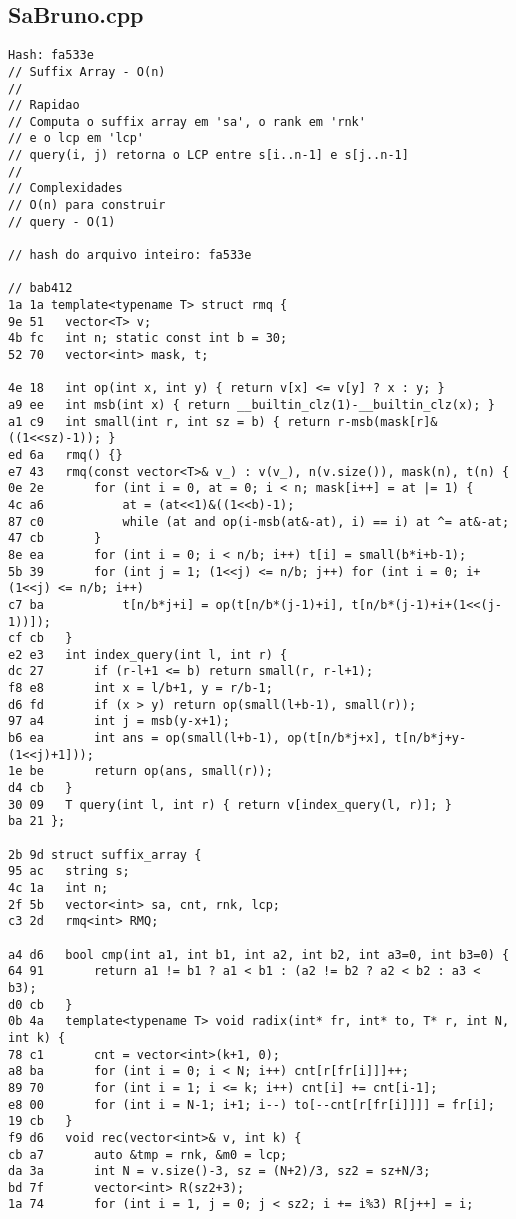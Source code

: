 \documentclass[11pt, a4paper, twoside]{article}
\begin{document}
\subsection{SaBruno.cpp}
\begin{lstlisting}
Hash: fa533e
// Suffix Array - O(n)
//
// Rapidao
// Computa o suffix array em 'sa', o rank em 'rnk'
// e o lcp em 'lcp'
// query(i, j) retorna o LCP entre s[i..n-1] e s[j..n-1]
//
// Complexidades
// O(n) para construir
// query - O(1)

// hash do arquivo inteiro: fa533e

// bab412
1a 1a template<typename T> struct rmq {
9e 51 	vector<T> v;
4b fc 	int n; static const int b = 30;
52 70 	vector<int> mask, t;
      
4e 18 	int op(int x, int y) { return v[x] <= v[y] ? x : y; }
a9 ee 	int msb(int x) { return __builtin_clz(1)-__builtin_clz(x); }
a1 c9 	int small(int r, int sz = b) { return r-msb(mask[r]&((1<<sz)-1)); }
ed 6a 	rmq() {}
e7 43 	rmq(const vector<T>& v_) : v(v_), n(v.size()), mask(n), t(n) {
0e 2e 		for (int i = 0, at = 0; i < n; mask[i++] = at |= 1) {
4c a6 			at = (at<<1)&((1<<b)-1);
87 c0 			while (at and op(i-msb(at&-at), i) == i) at ^= at&-at;
47 cb 		}
8e ea 		for (int i = 0; i < n/b; i++) t[i] = small(b*i+b-1);
5b 39 		for (int j = 1; (1<<j) <= n/b; j++) for (int i = 0; i+(1<<j) <= n/b; i++)
c7 ba 			t[n/b*j+i] = op(t[n/b*(j-1)+i], t[n/b*(j-1)+i+(1<<(j-1))]);
cf cb 	}
e2 e3 	int index_query(int l, int r) {
dc 27 		if (r-l+1 <= b) return small(r, r-l+1);
f8 e8 		int x = l/b+1, y = r/b-1;
d6 fd 		if (x > y) return op(small(l+b-1), small(r));
97 a4 		int j = msb(y-x+1);
b6 ea 		int ans = op(small(l+b-1), op(t[n/b*j+x], t[n/b*j+y-(1<<j)+1]));
1e be 		return op(ans, small(r));
d4 cb 	}
30 09 	T query(int l, int r) { return v[index_query(l, r)]; }
ba 21 };

2b 9d struct suffix_array {
95 ac 	string s;
4c 1a 	int n;
2f 5b 	vector<int> sa, cnt, rnk, lcp;
c3 2d 	rmq<int> RMQ;
      
a4 d6 	bool cmp(int a1, int b1, int a2, int b2, int a3=0, int b3=0) {
64 91 		return a1 != b1 ? a1 < b1 : (a2 != b2 ? a2 < b2 : a3 < b3);
d0 cb 	}
0b 4a 	template<typename T> void radix(int* fr, int* to, T* r, int N, int k) {
78 c1 		cnt = vector<int>(k+1, 0);
a8 ba 		for (int i = 0; i < N; i++) cnt[r[fr[i]]]++;
89 70 		for (int i = 1; i <= k; i++) cnt[i] += cnt[i-1];
e8 00 		for (int i = N-1; i+1; i--) to[--cnt[r[fr[i]]]] = fr[i];
19 cb 	}
f9 d6 	void rec(vector<int>& v, int k) {
cb a7 		auto &tmp = rnk, &m0 = lcp;
da 3a 		int N = v.size()-3, sz = (N+2)/3, sz2 = sz+N/3;
bd 7f 		vector<int> R(sz2+3);
1a 74 		for (int i = 1, j = 0; j < sz2; i += i%3) R[j++] = i;
      

\end{lstlisting}
\end{document}
